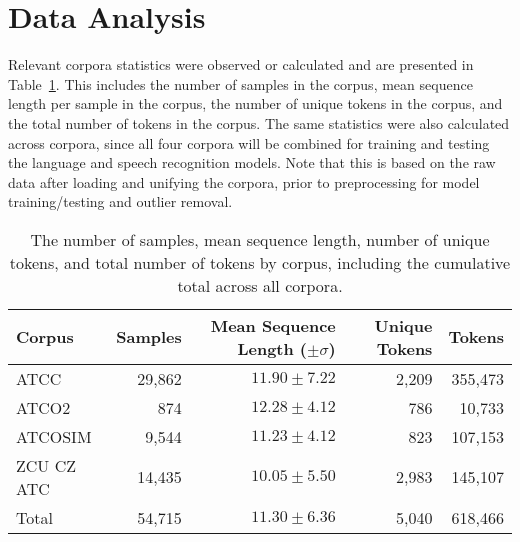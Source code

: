 \documentclass[12pt]{article}
\begin{document}
\section{Data Analysis}\label{sec:data_analysis}
Relevant corpora statistics were observed or calculated and are presented in Table~\ref{table:corpora_stats}. This includes the number of samples in
the corpus, mean sequence length per sample in the corpus, the number of unique tokens in the corpus, and the total number of tokens in the corpus.
The same statistics were also calculated across corpora, since all four corpora will be combined for training and testing the language and speech
recognition models. Note that this is based on the raw data after loading and unifying the corpora, prior to preprocessing for model training/testing
and outlier removal.


\begin{table}[h!]
    \centering
    \begin{tabular}{l r r r r}
        \toprule
        \textbf{Corpus} & \textbf{Samples} & \textbf{Mean Sequence Length (\(\pm \sigma\))} & \textbf{Unique Tokens} & \textbf{Tokens} \\
        \midrule
        ATCC            & 29,862           & \(11.90 \pm 7.22\)                             & 2,209                  & 355,473         \\
        ATCO2           & 874              & \(12.28 \pm 4.12\)                             & 786                    & 10,733          \\
        ATCOSIM         & 9,544            & \(11.23 \pm 4.12\)                             & 823                    & 107,153         \\
        ZCU CZ ATC      & 14,435           & \(10.05 \pm 5.50\)                             & 2,983                  & 145,107         \\
        \midrule
        Total           & 54,715           & \(11.30 \pm 6.36\)                             & 5,040                  & 618,466         \\
        \bottomrule
    \end{tabular}
    \label{table:corpora_stats}
    \caption{The number of samples, mean sequence length, number of unique tokens, and total number of tokens by corpus, including the cumulative
        total across all corpora.}
\end{table}
\end{document}
